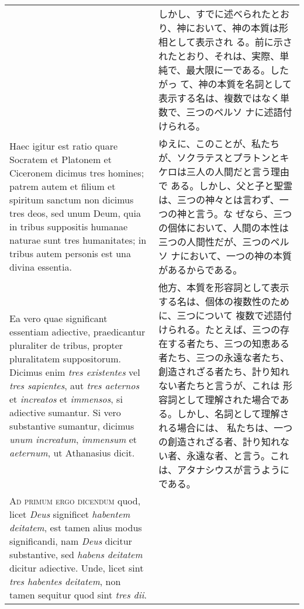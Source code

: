 \documentclass[10pt]{jsarticle} %
\begin{document}
\begin{longtable}{p{21em}p{21em}}
&

しかし、すでに述べられたとおり、神において、神の本質は形相として表示され
 る。前に示されたとおり、それは、実際、単純で、最大限に一である。したがっ
 て、神の本質を名詞として表示する名は、複数ではなく単数で、三つのペルソ
 ナに述語付けられる。



\\



Haec
igitur est ratio quare Socratem et Platonem et Ciceronem dicimus tres
homines; patrem autem et filium et spiritum sanctum non dicimus tres
deos, sed unum Deum, quia in tribus suppositis humanae naturae sunt tres
humanitates; in tribus autem personis est una divina essentia. 

&

ゆえに、このことが、私たちが、ソクラテスとプラトンとキケロは三人の人間だと言う理由で
 ある。しかし、父と子と聖霊は、三つの神々とは言わず、一つの神と言う。な
 ぜなら、三つの個体において、人間の本性は三つの人間性だが、三つのペルソ
 ナにおいて、一つの神の本質があるからである。



\\


Ea vero
quae significant essentiam adiective, praedicantur pluraliter de tribus,
propter pluralitatem suppositorum. Dicimus enim {\itshape tres existentes} vel {\itshape tres
sapientes}, aut {\itshape tres aeternos} et {\itshape increatos} et {\itshape immensos}, si adiective
sumantur. Si vero substantive sumantur, dicimus {\itshape unum increatum}, {\itshape immensum}
et {\itshape aeternum}, ut Athanasius dicit.


&

他方、本質を形容詞として表示する名は、個体の複数性のために、三つについて
 複数で述語付けられる。たとえば、三つの存在する者たち、三つの知恵ある
 者たち、三つの永遠な者たち、創造されざる者たち、計り知れない者たちと言うが、これは
 形容詞として理解された場合である。しかし、名詞として理解される場合には、
 私たちは、一つの創造されざる者、計り知れない者、永遠な者、と言う。これ
 は、アタナシウスが言うようにである。


\\



{\scshape Ad primum ergo dicendum} quod, licet {\itshape Deus} significet {\itshape habentem deitatem},
est tamen alius modus significandi, nam {\itshape Deus} dicitur substantive, sed
{\itshape habens deitatem} dicitur adiective. Unde, licet sint {\itshape tres habentes
deitatem}, non tamen sequitur quod sint {\itshape tres dii}.



\end{longtable}
\end{document}
